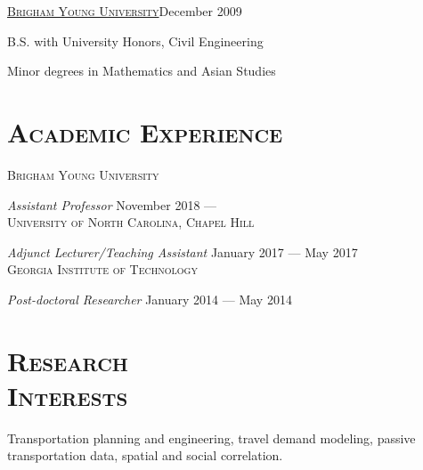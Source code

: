 \documentclass[margin,line]{res}
\newenvironment{list1}{
  \begin{list}{\ding{113}}{%
      \setlength{\itemsep}{0in}
      \setlength{\parsep}{0in} \setlength{\parskip}{0in}
      \setlength{\topsep}{0in} \setlength{\partopsep}{0in}
      \setlength{\leftmargin}{0.17in}}}{\end{list}}
\newenvironment{list2}{
  \begin{list}{$\bullet$}{%
      \setlength{\itemsep}{0in}
      \setlength{\parsep}{0in} \setlength{\parskip}{0in}
      \setlength{\topsep}{0in} \setlength{\partopsep}{0in}
      \setlength{\leftmargin}{0.2in}}}{\end{list}}
\newcommand{\secfont}{\scshape }
\newcommand{\acc}{\scshape }
\begin{document}
\begin{resume}
\href{http://www.byu.edu}{\acc Brigham Young University}\hfill{December 2009}
\\
\vspace*{-.1in}
\begin{list1}
  \item[] B.S. with University Honors, Civil Engineering
	\item[] Minor	degrees in Mathematics and Asian Studies
\end{list1}

\noindent\makebox[\linewidth]{\rule{\linewidth}{0.4pt}}
\section{\secfont Academic Experience}

{\acc Brigham Young University}

\vspace{-.4cm}
\textit{Assistant Professor} \hfill {November 2018 --- }\\

\vspace{-.4cm}
{\acc University of North Carolina, Chapel Hill}

\vspace{-.4cm}
\textit{Adjunct Lecturer/Teaching Assistant} \hfill {January 2017 --- May 2017}\\

\vspace{-.4cm}
{\acc Georgia Institute of Technology}

\vspace{-.4cm}
\textit{Post-doctoral Researcher} \hfill {January 2014 --- May 2014}\\

\vspace{-.4cm}
\section{\secfont Research\\ Interests}
Transportation planning and engineering, travel demand modeling,
passive transportation data, spatial and social correlation.


\end{resume}
\end{document}
